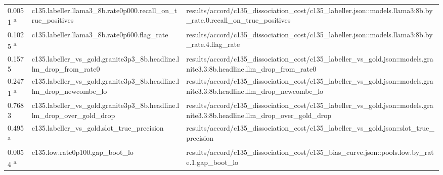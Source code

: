 \begin{longtable}{@{}p{0.7in}p{1.9in}p{2.6in}@{}}
0.0051 \textsuperscript{a} & c135.\allowbreak{}labeller.\allowbreak{}llama3\_8b.\allowbreak{}rate0p000.\allowbreak{}recall\_on\_true\_positives & results/\allowbreak{}accord/\allowbreak{}c135\_dissociation\_cost/\allowbreak{}c135\_labeller.\allowbreak{}json::models.\allowbreak{}llama3:8b.\allowbreak{}by\_rate.\allowbreak{}0.\allowbreak{}recall\_on\_true\_positives\\
0.1025 \textsuperscript{a} & c135.\allowbreak{}labeller.\allowbreak{}llama3\_8b.\allowbreak{}rate0p600.\allowbreak{}flag\_rate & results/\allowbreak{}accord/\allowbreak{}c135\_dissociation\_cost/\allowbreak{}c135\_labeller.\allowbreak{}json::models.\allowbreak{}llama3:8b.\allowbreak{}by\_rate.\allowbreak{}4.\allowbreak{}flag\_rate\\
0.1575 & c135.\allowbreak{}labeller\_vs\_gold.\allowbreak{}granite3p3\_8b.\allowbreak{}headline.\allowbreak{}llm\_drop\_from\_rate0 & results/\allowbreak{}accord/\allowbreak{}c135\_dissociation\_cost/\allowbreak{}c135\_labeller\_vs\_gold.\allowbreak{}json::models.\allowbreak{}granite3.\allowbreak{}3:8b.\allowbreak{}headline.\allowbreak{}llm\_drop\_from\_rate0\\
0.2471 \textsuperscript{a} & c135.\allowbreak{}labeller\_vs\_gold.\allowbreak{}granite3p3\_8b.\allowbreak{}headline.\allowbreak{}llm\_drop\_newcombe\_lo & results/\allowbreak{}accord/\allowbreak{}c135\_dissociation\_cost/\allowbreak{}c135\_labeller\_vs\_gold.\allowbreak{}json::models.\allowbreak{}granite3.\allowbreak{}3:8b.\allowbreak{}headline.\allowbreak{}llm\_drop\_newcombe\_lo\\
0.7683 & c135.\allowbreak{}labeller\_vs\_gold.\allowbreak{}granite3p3\_8b.\allowbreak{}headline.\allowbreak{}llm\_drop\_over\_gold\_drop & results/\allowbreak{}accord/\allowbreak{}c135\_dissociation\_cost/\allowbreak{}c135\_labeller\_vs\_gold.\allowbreak{}json::models.\allowbreak{}granite3.\allowbreak{}3:8b.\allowbreak{}headline.\allowbreak{}llm\_drop\_over\_gold\_drop\\
0.495 \textsuperscript{a} & c135.\allowbreak{}labeller\_vs\_gold.\allowbreak{}slot\_true\_precision & results/\allowbreak{}accord/\allowbreak{}c135\_dissociation\_cost/\allowbreak{}c135\_labeller\_vs\_gold.\allowbreak{}json::slot\_true\_precision\\
0.0054 \textsuperscript{a} & c135.\allowbreak{}low.\allowbreak{}rate0p100.\allowbreak{}gap\_boot\_lo & results/\allowbreak{}accord/\allowbreak{}c135\_dissociation\_cost/\allowbreak{}c135\_bias\_curve.\allowbreak{}json::pools.\allowbreak{}low.\allowbreak{}by\_rate.\allowbreak{}1.\allowbreak{}gap\_boot\_lo\\

\end{longtable}
